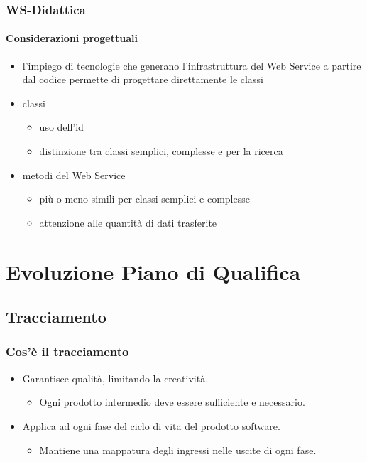 \begin{frame}
\frametitle{WS-Didattica}
\framesubtitle{Considerazioni progettuali}

\begin{itemize}
\item l'impiego di tecnologie che generano l'infrastruttura del Web Service a partire dal codice permette di progettare direttamente le classi
\item classi
\begin{itemize}
\item uso dell'id
\item distinzione tra classi semplici, complesse e per la ricerca
\end{itemize}

\item metodi del Web Service
\begin{itemize}
\item più o meno simili per classi semplici e complesse
\item attenzione alle quantità di dati trasferite
\end{itemize}


\end{itemize}

\end{frame}

\section{Evoluzione Piano di Qualifica}
\subsection{Tracciamento}

\begin{frame}
\frametitle{Cos'è il tracciamento}



\begin{itemize}
\item Garantisce qualità, limitando la creatività.
\begin{itemize}
\item Ogni prodotto intermedio deve essere sufficiente e necessario.
\end{itemize}
\item Applica ad ogni fase del ciclo di vita del prodotto software.
\begin{itemize}
\item Mantiene una mappatura degli ingressi nelle uscite di ogni fase.
\end{itemize}
\end{itemize}

\end{frame}

